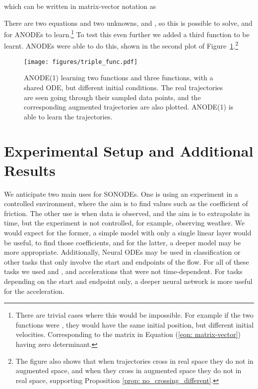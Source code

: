 \documentclass{article}
\theoremstyle{remark}
\theoremstyle{definition}
\begin{document}
which can be written in matrix-vector notation as

There are two equations and two unknowns,  and , so this is possible to solve, and for ANODEs to learn.\footnote{There are trivial cases where this would be impossible. For example if the two functions were , they would have the same initial position, but different initial velocities. Corresponding to the matrix in Equation (\ref{eqn: matrix-vector}) having zero determinant.} To test this even further we added a third function to be learnt. ANODEs were able to do this, shown in the second plot of Figure~\ref{fig: anode_3_funcs}.\footnote{The figure also shows that when trajectories cross in real space they do not in augmented space, and when they cross in augmented space they do not in real space, supporting Proposition \ref{prop: no_crossing_different}.} 

\begin{figure}[h]
    \centering
    \texttt{[image: figures/triple\_func.pdf]}
    \caption{ANODE(1) learning two functions and three functions, with a shared ODE, but different initial conditions. The real trajectories are seen going through their sampled data points, and the corresponding augmented trajectories are also plotted. ANODE(1) is able to learn the trajectories.}
    \label{fig: anode_3_funcs}
\end{figure}







\section{Experimental Setup and Additional Results}
\label{app: experimental_setup}

We anticipate two main uses for SONODEs. One is using an experiment in a controlled environment, where the aim is to find values such as the coefficient of friction. The other use is when data is observed, and the aim is to extrapolate in time, but the experiment is not controlled, for example, observing weather. We would expect for the former, a simple model with only a single linear layer would be useful, to find those coefficients, and for the latter, a deeper model may be more appropriate. Additionally, Neural ODEs may be used in classification or other tasks that only involve the start and endpoints of the flow. For all of these tasks we used  and , and accelerations that were not time-dependent. For tasks depending on the start and endpoint only, a deeper neural network is more useful for the acceleration.
\end{document}
